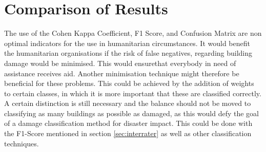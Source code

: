 \section{Comparison of Results}
The use of the Cohen Kappa Coefficient, F1 Score, and Confusion Matrix are non optimal indicators for the use in humanitarian circumstances. It would benefit the humanitarian organisations if the risk of false negatives, regarding building damage would be minimised. This would ensurethat everybody in need of assistance receives aid. Another minimisation technique might therefore be beneficial for these problems. This could be achieved by the addition of weights to certain classes, in which it is more important that these are classified correctly. A certain distinction is still necessary and the balance should not be moved to classifying as many buildings as possible as damaged, as this would defy the goal of a damage classification method for disaster impact. This could be done with the F1-Score mentioned in section \ref{sec:interrater} as well as other classification techniques.